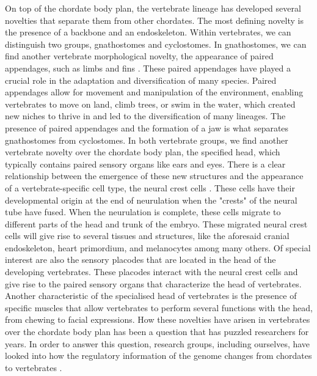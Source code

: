 On top of the chordate body plan, the vertebrate lineage has developed several novelties that separate them from other chordates. The most defining novelty is the presence of a backbone and an endoskeleton. Within vertebrates, we can distinguish two groups, gnathostomes and cyclostomes. In gnathostomes, we can find another vertebrate morphological novelty, the appearance of paired appendages, such as limbs and fins \parencite{freitas_new_2014, cass_conserved_2021}. These paired appendages have played a crucial role in the adaptation and diversification of many species. Paired appendages allow for movement and manipulation of the environment, enabling vertebrates to move on land, climb trees, or swim in the water, which created new niches to thrive in and led to the diversification of many lineages. The presence of paired appendages and the formation of a jaw is what separates gnathostomes from cyclostomes. In both vertebrate groups, we find another vertebrate novelty over the chordate body plan, the specified head, which typically contains paired sensory organs like ears and eyes. There is a clear relationship between the emergence of these new structures and the appearance of a vertebrate-specific cell type, the neural crest cells \parencite{york_evolutionary_2020, martik_riding_2021, rothstein_evolutionary_2023}. These cells have their developmental origin at the end of neurulation when the "crests" of the neural tube have fused. When the neurulation is complete, these cells migrate to different parts of the head and trunk of the embryo. These migrated neural crest cells will give rise to several tissues and structures, like the aforesaid cranial endoskeleton, heart primordium, and melanocytes among many others. Of special interest are also the sensory placodes that are located in the head of the developing vertebrates. These placodes interact with the neural crest cells and give rise to the paired sensory organs that characterize the head of vertebrates. Another characteristic of the specialised head of vertebrates is the presence of specific muscles that allow vertebrates to perform several functions with the head, from chewing to facial expressions. How these novelties have arisen in vertebrates over the chordate body plan has been a question that has puzzled researchers for years. In order to answer this question, research groups, including ourselves, have looked into how the regulatory information of the genome changes from chordates to vertebrates \parencite{van_otterloo_gene_2013, marletaz_amphioxus_2018}.



